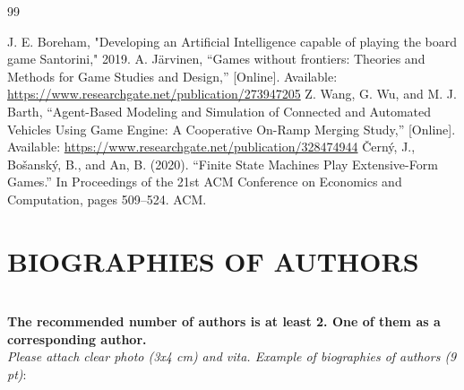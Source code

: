 \documentclass{telkomnika}
\begin{document}


%


\begin{thebibliography} {99} 
\footnotesize
\itemsep 0pt 




J. E. Boreham, "Developing an Artificial Intelligence capable of playing the board game Santorini," 2019.
A. Järvinen, ``Games without frontiers: Theories and Methods for Game Studies and Design,'' [Online]. Available: \url{https://www.researchgate.net/publication/273947205}
Z. Wang, G. Wu, and M. J. Barth, ``Agent-Based Modeling and Simulation of Connected and Automated Vehicles Using Game Engine: A Cooperative On-Ramp Merging Study,'' [Online]. Available: \url{https://www.researchgate.net/publication/328474944}
Černý, J., Bošanský, B., and An, B. (2020). ``Finite State Machines Play Extensive-Form Games.'' In Proceedings of the 21st ACM Conference on Economics and Computation, pages 509--524. ACM.


\end{thebibliography}

\newpage

\section*{BIOGRAPHIES OF AUTHORS} 
\small
\textbf{\\The recommended number of authors is at least 2. One of them as a corresponding author.}
\textit{\\Please attach clear photo (3x4 cm) and vita. Example of biographies of authors (9 pt)}:
\small
\end{document}

